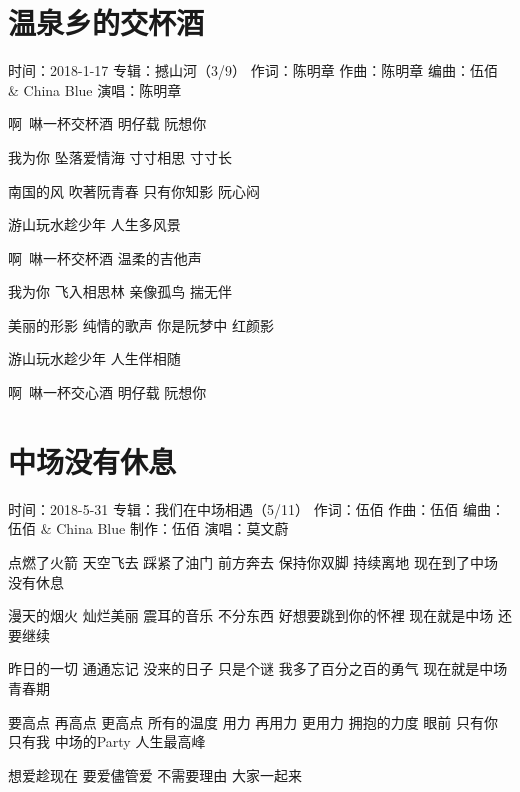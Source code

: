\documentclass[UTF8,a4paper,oneside,twocolumn,12pt]{ctexbook}
\newcommand{\infopair}[2]{\textbullet #1：#2}
\newcommand{\zc}[1][伍佰]{\infopair{作词}{#1}}
\newcommand{\zq}[1][伍佰]{\infopair{作曲}{#1}}
\newcommand{\bq}[1][伍佰]{\infopair{编曲}{#1}}
\newcommand{\zj}[1]{\infopair{专辑}{#1}}
\newcommand{\zz}[1]{\infopair{制作}{#1}}
\newcommand{\sj}[1]{\infopair{时间}{#1}}
\newenvironment{info}{\begin{flushleft}\kaishu
	}
	{\end{flushleft}\normalsize\yahei\par}
\newenvironment{lyric}{
	}
{}
\begin{document}
\section{温泉乡的交杯酒}
\begin{info}%
	\sj{2018-1-17}
	\zj{撼山河（3/9）}
	\zc[陈明章]
	\zq[陈明章]
	\bq[伍佰 \& China Blue]
	\infopair{演唱}{陈明章}
\end{info}
\begin{lyric}%
	啊~啉一杯交杯酒
	明仔载
	阮想你

	我为你
	坠落爱情海
	寸寸相思
	寸寸长

	南国的风
	吹著阮青春
	只有你知影
	阮心闷

	游山玩水趁少年
	人生多风景

	啊~啉一杯交杯酒
	温柔的吉他声

	我为你
	飞入相思林
	亲像孤鸟
	揣无伴

	美丽的形影
	纯情的歌声
	你是阮梦中
	红颜影

	游山玩水趁少年
	人生伴相随

	啊~啉一杯交心酒
	明仔载
	阮想你
\end{lyric}

\section{中场没有休息}
\begin{info}
	\sj{2018-5-31}
	\zj{我们在中场相遇（5/11）}
	\zc
	\zq
	\bq[伍佰 \& China Blue]
	\zz{伍佰}
	\infopair{演唱}{莫文蔚}
\end{info}
\begin{lyric}
	点燃了火箭 天空飞去
	踩紧了油门 前方奔去
	保持你双脚 持续离地
	现在到了中场 没有休息

	漫天的烟火 灿烂美丽
	震耳的音乐 不分东西
	好想要跳到你的怀裡
	现在就是中场 还要继续

	昨日的一切 通通忘记
	没来的日子 只是个谜
	我多了百分之百的勇气
	现在就是中场青春期

	要高点 再高点 更高点 所有的温度
	用力 再用力 更用力 拥抱的力度
	眼前 只有你 只有我 中场的Party
	人生最高峰

	想爱趁现在 要爱儘管爱
	不需要理由 大家一起来
\end{lyric}
\end{document}
